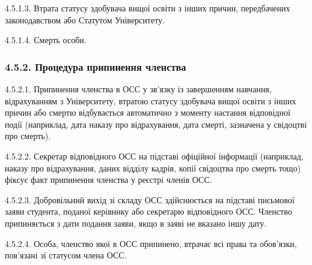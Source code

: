         4.5.1.3. Втрата статусу здобувача вищої освіти з інших причин, передбачених законодавством або Статутом Університету.

        4.5.1.4. Смерть особи.
    \subsubsection*{4.5.2. Процедура припинення членства}
        4.5.2.1. Припинення членства в ОСС у зв'язку із завершенням навчання, відрахуванням з Університету, втратою статусу здобувача вищої освіти з інших причин або смертю відбувається автоматично з моменту настання відповідної події (наприклад, дата наказу про відрахування, дата смерті, зазначена у свідоцтві про смерть).

        4.5.2.2. Секретар відповідного ОСС на підставі офіційної інформації (наприклад, наказу про відрахування, даних відділу кадрів, копії свідоцтва про смерть тощо) фіксує факт припинення членства у реєстрі членів ОСС.

        4.5.2.3. Добровільний вихід зі складу ОСС здійснюється на підставі письмової заяви студента, поданої керівнику або секретарю відповідного ОСС. Членство припиняється з дати подання заяви, якщо в заяві не вказано іншу дату.

        4.5.2.4. Особа, членство якої в ОСС припинено, втрачає всі права та обов'язки, пов'язані зі статусом члена ОСС.
